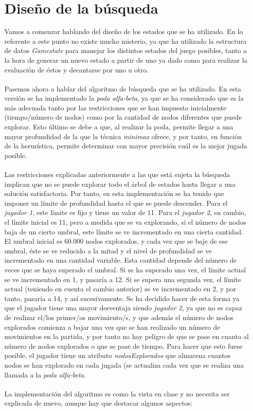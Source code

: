 \documentclass{article}
\begin{document}
  \section{Diseño de la búsqueda}
  Vamos a comenzar hablando del diseño de los estados que se ha utilizado. En lo referente a este punto no existe mucho misterio, ya que ha utilizado la estructura de datos \textit{Gamestate} para manejar los distintos estados del juego posibles, tanto a la hora de generar un nuevo estado a partir de uno ya dado como para realizar la evaluación de éstos y decantarse por uno u otro. \\\\
  Pasemos ahora a hablar del algoritmo de búsqueda que se ha utilizado. En esta versión se ha implementado la \textit{poda alfa-beta}, ya que se ha considerado que es la más adecuada tanto por las restricciones que se han impuesto inicialmente (tiempo/número de nodos) como por la cantidad de nodos diferentes que puede explorar. Esto último se debe a que, al realizar la poda, permite llegar a una mayor profundidad de la que la técnica \textit{minimax} ofrece, y por tanto, en función de la herurística, permite determinar con mayor precisión cuál es la mejor jugada posible. \\\\
  Las restricciones explicadas anteriormente a las que está sujeta la búsqueda implican que no se puede explorar todo el árbol de estados hasta llegar a una solución satisfactoria. Por tanto, en esta implementación se ha tenido que imponer un límite de profundidad hasta el que se puede descender. Para el \textit{jugador 1}, este límite es fijo y tiene un valor de 11. Para el \textit{jugador 2}, en cambio, el límite inicial es 11, pero a medida que se va explorando, si el número de nodos baja de un cierto umbral, este límite se ve incrementado en una cierta cantidad. El umbral inicial es 60.000 nodos explorados, y cada vez que se baje de ese umbral, éste se ve reducido a la mitad y el nivel de profundidad se ve incrementado en una cantidad variable. Esta cantidad depende del número de veces que se haya superado el umbral. Si se ha superado una vez, el límite actual se ve incrementado en 1, y pasaría a 12. Si se supera una segunda vez, el límite actual (teniendo en cuenta el cambio anterior) se ve incrementado en 2, y por tanto, pasaría a 14, y así sucesivamente. Se ha decidido hacer de esta forma ya que el jugador tiene una mayor desventaja siendo \textit{jugador 2}, ya que no es capaz de realizar el/los primer/os movimiento/s, y que además el número de nodos explorados comienza a bajar una vez que se han realizado un número de movimientos en la partida, y por tanto no hay peligro de que se pase en cuanto al número de nodos explorados o que se pase de tiempo. Para hacer que esto fuese posible, el jugador tiene un atributo \textit{nodosExplorados} que almacena cuantos nodos se han explorado en cada jugada (se actualiza cada vez que se realiza una llamada a la \textit{poda alfa-beta}.\\\\
  La implementación del algoritmo es como la vista en clase y no necesita ser explicada de nuevo, aunque hay que destacar algunos aspectos:
  
\end{document}
